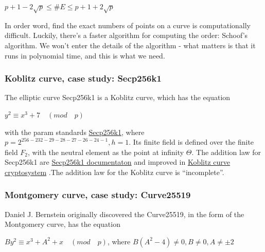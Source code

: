 \hspace{0.25cm}
\begin{center}
  $p+1-2\sqrt{p} \leq \#E \leq p+1+2\sqrt{p}$\\
\end{center}
\hspace{0.25cm}

In order word, find the exact numbers of points on a curve is computationally difficult. Luckily, there's a faster algorithm for computing the order: Schoof's algorithm. We won't enter the details of the algorithm - what matters is that it runs in polynomial time, and this is what we need.

\subsubsection{Koblitz curve, case study: Secp256k1}
The elliptic curve Secp256k1 is a Koblitz curve, which has the equation

\hspace{0.25cm}
\begin{center}
  $y^2 \equiv x^3 + 7 \quad (mod \quad p)$
\end{center}
\hspace{0.25cm}

with the param standards \href{https://en.bitcoin.it/wiki/Secp256k1}{Secp256k1}, where $p = 2^{256 - 232 - 29 - 28 - 27 - 26 - 24 - 1}, h = 1$. Its finite field is defined over the finite field $F_2$, with the neutral element as the point at infinity $\Theta$. The addition law for Secp256k1 are \href{https://www.researchgate.net/publication/332783847_Arithmetic_of_Koblitz_Curve_Secp256k1_Used_in_Bitcoin_Cryptocurrency_Based_on_One_Variable_Polynomial_Division}{Secp256k1 documentaton} and improved in \href{https://www.researchgate.net/publication/223346975_Koblitz_curve_cryptosystems}{Koblitz curve cryptosystem} .The addition law for the Koblitz curve is “incomplete”.

\subsubsection{Montgomery curve, case study: Curve25519}
Daniel J. Bernstein originally discovered the Curve25519, in the form of the Montgomery curve, has the equation

\hspace{0.25cm}
\begin{center}
  $By^2 \equiv x^3 + A^2 + x \quad (mod \quad p)$, where $B(A^2-4) \neq 0, B \neq 0, A \neq \pm 2$
\end{center}
\hspace{0.25cm}

